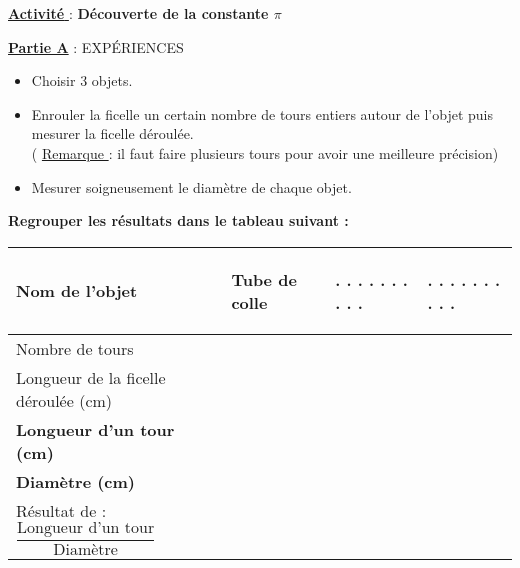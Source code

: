 \documentclass[a4paper,11pt]{article}
\newcommand{\bi}{\begin{itemize}}
\newcommand{\ei}{\end{itemize}}
\begin{document}
\begin{center}
\underline{{\Large \textbf{Activité}  }}: {\large\textbf{ Découverte de la constante $\pi$}}
\end{center}

\vspace*{1cm}

{\large \textbf{\underline{Partie A}} : EXPÉRIENCES }\\

\bi

\item Choisir 3 objets.\\

\item Enrouler la ficelle un certain nombre de tours entiers autour de l'objet puis mesurer la ficelle déroulée.\\
( \underline{Remarque }: il faut faire plusieurs tours pour avoir une meilleure précision)  \\

\item Mesurer soigneusement le diamètre de chaque objet.\\


\ei

\textbf{Regrouper les résultats dans le tableau suivant : }

\renewcommand{\arraystretch}{2.2}

\begin{flushleft}
\begin{tabular}{|m{7cm}|m{3.5cm}|m{3.5cm}|m{3.5cm}|}
\hline 
\begin{center}
 \textbf{Nom de l'objet}
 \end{center} & \begin{center}
 Tube de colle
 \end{center}  & \begin{center}
 . . . . . . . . . .
 \end{center} &  \begin{center}
 . . . . . . . . . .
 \end{center}   \\ 
\hline 
Nombre de tours&  &  &     \\ 
\hline 
Longueur de la ficelle déroulée (cm) &  &   &    \\ 
\hline 
\textbf{Longueur d'un tour (cm)}&  &  &    \\ 
\hline 
\textbf{Diamètre (cm)} &  &  &     \\ 
\hline
Résultat de : \hspace*{0.75cm}$\dfrac{\text{Longueur d'un tour}}{\text{Diamètre}}$ &  &  &     \\ 
\hline
\end{tabular} 
\end{flushleft}
\vspace*{0.5cm}
\end{document}
